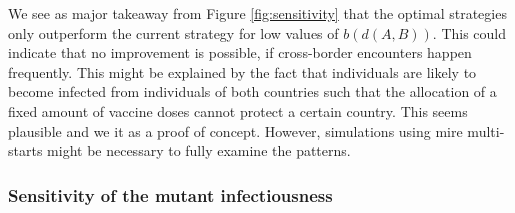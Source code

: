 We see as major takeaway from Figure \ref{fig:sensitivity} that the optimal strategies only outperform the current strategy for low values of $b(d(A,B))$. This could indicate that no improvement is possible, if cross-border encounters happen frequently. This might be explained by the fact that individuals are likely to become infected from individuals of both countries such that the allocation of a fixed amount of vaccine doses cannot protect a certain country. This seems plausible and we it as a proof of concept. However, simulations using mire multi-starts might be necessary to fully examine the patterns.



\subsubsection{Sensitivity of the mutant infectiousness}
\label{A:eta}

